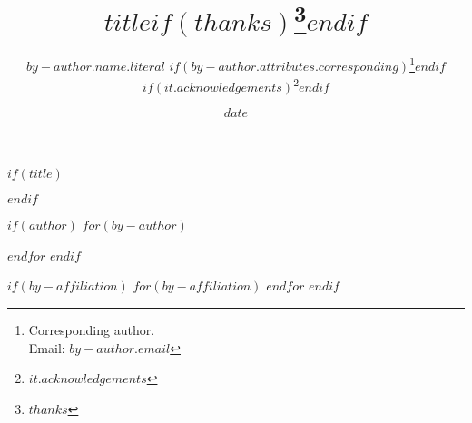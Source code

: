 $if(title)$
\title{$title$$if(thanks)$\thanks{$thanks$}$endif$}
$endif$

$if(author)$
$for(by-author)$
\author[$for(by-author.affiliations)$$it.number$$sep$, $endfor$]{$by-author.name.literal$%
$if(by-author.attributes.corresponding)$\thanks{Corresponding author.\\ Email: \texttt{$by-author.email$}}$endif$%
  $if(it.acknowledgements)$\thanks{$it.acknowledgements$}$endif$ }
$endfor$
$endif$

$if(by-affiliation)$
$for(by-affiliation)$
$endfor$
$endif$

\date{$date$}